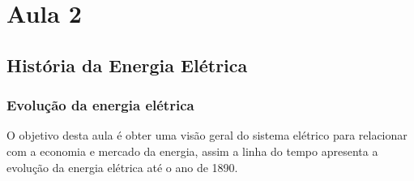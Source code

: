 \section{Aula 2}

\subsection{História da Energia Elétrica}


\subsubsection{Evolução da energia elétrica}

O objetivo desta aula é obter uma visão geral do sistema elétrico
para relacionar com a economia e mercado da energia, assim a linha
do tempo apresenta a evolução da energia elétrica até o ano
de 1890.


